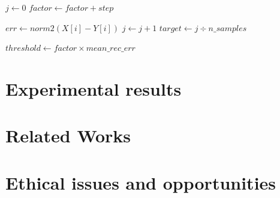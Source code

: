 \documentclass{article}
\begin{document}
\begin{multicols*}{2}
\begin{algorithm}[H]
\begin{algorithmic}
			\STATE $j \gets 0$
				\STATE $factor \gets factor + step$
				
					\STATE $err \gets norm2(X[i] - Y[i])$
					\STATE $j \gets j+1$
					\ENDIF
				\ENDFOR
			\STATE$target \gets j \div n\_samples$
	\ENDWHILE\
	
	\STATE $threshold \gets factor \times mean\_rec\_err$
\end{algorithmic}
\end{algorithm}
		
\section{Experimental results}
\label{results}
		
		
\section{Related Works}
		
\section{Ethical issues and opportunities}
		\label{ethics}
		
\nocite{*}
\printbibliography
		
		
	\end{multicols*}
	
\end{document}
